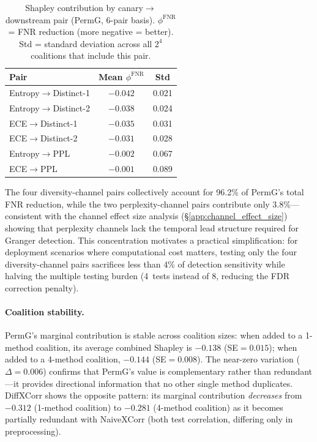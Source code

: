 \begin{table}[H]
\centering
\small
\caption{Shapley contribution by canary$\to$downstream pair (PermG, 6-pair basis). $\phi^{\text{FNR}}$ = FNR reduction (more negative = better). Std = standard deviation across all $2^4$ coalitions that include this pair.}
\label{tab:shapley_per_pair}
\begin{tabular}{lcc}
\toprule
Pair & Mean $\phi^{\text{FNR}}$ & Std \\
\midrule
Entropy$\to$Distinct-1 & $-0.042$ & 0.021 \\
Entropy$\to$Distinct-2 & $-0.038$ & 0.024 \\
ECE$\to$Distinct-1 & $-0.035$ & 0.031 \\
ECE$\to$Distinct-2 & $-0.031$ & 0.028 \\
Entropy$\to$PPL & $-0.002$ & 0.067 \\
ECE$\to$PPL & $-0.001$ & 0.089 \\
\bottomrule
\end{tabular}
\end{table}

The four diversity-channel pairs collectively account for 96.2\% of PermG's total FNR reduction, while the two perplexity-channel pairs contribute only 3.8\%---consistent with the channel effect size analysis (\S\ref{app:channel_effect_size}) showing that perplexity channels lack the temporal lead structure required for Granger detection.
This concentration motivates a practical simplification: for deployment scenarios where computational cost matters, testing only the four diversity-channel pairs sacrifices less than 4\% of detection sensitivity while halving the multiple testing burden (4~tests instead of 8, reducing the FDR correction penalty).

\paragraph{Coalition stability.}
PermG's marginal contribution is stable across coalition sizes: when added to a 1-method coalition, its average combined Shapley is $-0.138$ (SE${=}0.015$); when added to a 4-method coalition, $-0.144$ (SE${=}0.008$).
The near-zero variation ($\Delta{=}0.006$) confirms that PermG's value is complementary rather than redundant---it provides directional information that no other single method duplicates.
DiffXCorr shows the opposite pattern: its marginal contribution \emph{decreases} from $-0.312$ (1-method coalition) to $-0.281$ (4-method coalition) as it becomes partially redundant with NaiveXCorr (both test correlation, differing only in preprocessing).


